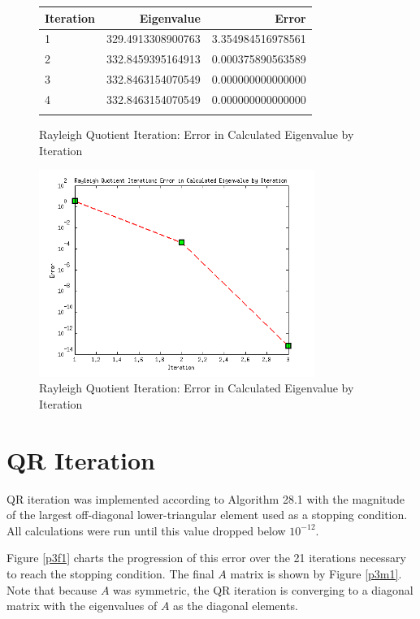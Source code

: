\documentclass{article}
\begin{document}
\begin{figure}
\centering
\begin{tabular}{lrr}
\toprule
Iteration & Eigenvalue & Error \\
\midrule
 1 & 329.4913308900763 & 3.354984516978561 \\
 2 & 332.8459395164913 & 0.000375890563589 \\
 3 & 332.8463154070549 & 0.000000000000000 \\
 4 & 332.8463154070549 & 0.000000000000000 \\
\bottomrule
\label{p2t1}
\end{tabular}
\caption{Rayleigh Quotient Iteration: Error in Calculated Eigenvalue by Iteration}
\end{figure}

\begin{figure}
\centering
\includegraphics[width=0.8\textwidth]{Problem2Figure1.png}
\caption{Rayleigh Quotient Iteration: Error in Calculated Eigenvalue by Iteration}
\label{p2f1}
\end{figure}

\section{QR Iteration}\label{p3}

QR iteration was implemented according to Algorithm 28.1 with the magnitude of the largest off-diagonal lower-triangular element used as a stopping condition. All calculations were run until this value dropped below \(10^{-12}\).

Figure \ref{p3f1} charts the progression of this error over the 21 iterations necessary to reach the stopping condition. The final \(A\) matrix is shown by Figure \ref{p3m1}. Note that because \(A\) was symmetric, the QR iteration is converging to a diagonal matrix with the eigenvalues of \(A\) as the diagonal elements.
\end{document}
